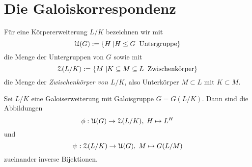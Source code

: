 \documentclass{book}
\begin{document}
\section{Die Galoiskorrespondenz}%
\label{sec:die_galoiskorrespondenz}

Für eine Körpererweiterung $L/K$ bezeichnen wir mit
\[
    \EuScript{U}(G) := \{ H \; | H \le G\; \;\text{Untergruppe}\}
\]
die Menge der Untergruppen von $G$ sowie mit
\[
    \EuScript{Z}(L/K) := \{ M \; | K \subseteq M \subseteq L\; \;\text{Zwischenkörper}\}
\]
die Menge der {\em Zwischenkörper von $L/K$}, also Unterkörper $M \subset L$ mit $K \subset M$. 

\begin{thm}[Galoiskorrespondenz]
    \label{thm:hauptsatz}
    Sei $L/K$ eine Galoiserweiterung mit Galoisgruppe $G=G(L/K)$. Dann sind die Abbildungen
    \[
         \phi: \eU(G) \to \eZ(L/K), \; H \mapsto L^H
    \]
    und 
    \[
         \psi: \EuScript{Z}(L/K) \to \EuScript{U}(G), \; M \mapsto G(L/M)
    \]
    zueinander inverse Bijektionen.
\end{thm}
\end{document}
